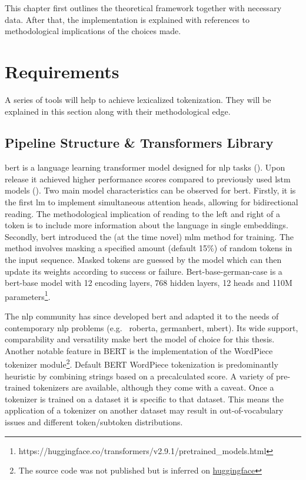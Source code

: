 This chapter first outlines the theoretical framework together with necessary data.
After that, the implementation is explained with references to methodological implications of the choices made.

\section{Requirements}
\label{sec:requirements}
A series of tools will help to achieve lexicalized tokenization.
They will be explained in this section along with their methodological edge.

\subsection{Pipeline Structure \& Transformers Library}
\label{subsec:architecture}

\ac{bert} is a language learning transformer model designed for \ac{nlp} tasks (\cite{ATTENTION}).
Upon release it achieved higher performance scores compared to previously used \ac{lstm} models (\cite{BERTHIGH1}).
Two main model characteristics can be observed for \ac{bert}.
Firstly, it is the first \ac{lm} to implement simultaneous attention heads, allowing for bidirectional reading.
The methodological implication of reading to the left and right of a token is to include more information about the language in single embeddings.
Secondly, \ac{bert} introduced the (at the time novel) \ac{mlm} method for training.
The method involves masking a specified amount (default 15\%) of random tokens in the input sequence.
Masked tokens are guessed by the model which can then update its weights according to success or failure.
Bert-base-german-case is a \ac{bert}-base model with 12 encoding layers, 768 hidden layers, 12 heads and 110M parameters\footnote{https://huggingface.co/transformers/v2.9.1/pretrained_models.html}.

The \ac{nlp} community has since developed \ac{bert} and adapted it to the needs of contemporary \ac{nlp} problems (e.g. \ roberta, germanbert, mbert).
Its wide support, comparability and versatility make \ac{bert} the model of choice for this thesis.
Another notable feature in \uppercase{bert} is the implementation of the WordPiece tokenizer module\footnote{The source code was not published but is inferred on \href{https://huggingface.co/course/chapter6/6?fw=pt}{huggingface}}.
Default BERT WordPiece tokenization is predominantly heuristic by combining strings based on a precalculated score.
A variety of pre-trained tokenizers are available, although they come with a caveat.
Once a tokenizer is trained on a dataset it is specific to that dataset.
This means the application of a tokenizer on another dataset may result in out-of-vocabulary issues and different token/subtoken distributions.

